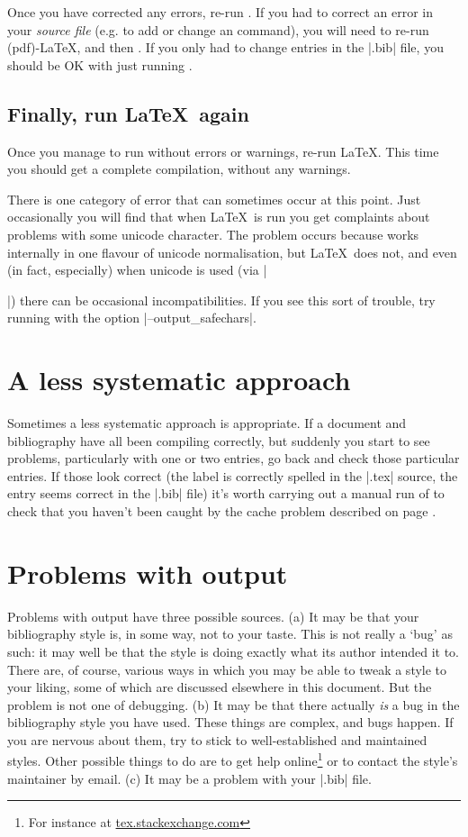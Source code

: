 Once you have corrected any errors, re-run . If you had
to correct an error in your \emph{source file} (e.g. to add or change
an  command), you will need to re-run (pdf)-\LaTeX,
and then . If you only had to change entries in the
|.bib| file, you should be OK with just running .

\subsection{Finally, run \LaTeX\ again}

Once you manage to run  without errors or warnings,
re-run \LaTeX. This time you should get a complete compilation,
without any warnings.

There is one category of error that can sometimes occur at this
point. Just occasionally you will find that when \LaTeX\ is run you
get complaints about problems with some unicode character. The problem
occurs because  works internally in one flavour of
unicode normalisation, but \LaTeX\ does not, and even (in fact,
especially) when unicode is used (via |\usepackage[utf8]{inputenc}|)
there can be occasional incompatibilities. If you see this sort of
trouble, try running  with the option
|--output_safechars|.

\section{A less systematic approach}

Sometimes a less systematic approach is appropriate. If a document and
bibliography have all been compiling correctly, but suddenly you start
to see problems, particularly with one or two entries, go back and
check those particular entries. If those look correct (the label is
correctly spelled in the |.tex| source, the entry seems correct in the
|.bib| file) it's worth carrying out a manual run of 
to check that you haven't been caught by the cache problem described
on page \pageref{cache}.

\section{Problems with output}

Problems with output have three possible sources. (a) It may be that
your bibliography style is, in some way, not to your taste. This is
not really a `bug' as such: it may well be that the style is doing
exactly what its author intended it to. There are, of course, various
ways in which you may be able to tweak a style to your liking, some of
which are discussed elsewhere in this document. But the problem is not
one of debugging. (b) It may be that there actually \emph{is} a bug in
the bibliography style you have used. These things are complex, and
bugs happen. If you are nervous about them, try to stick to
well-established and maintained styles. Other possible things to do
are to get help online\footnote{For instance at
  \url{tex.stackexchange.com}} or to contact the style's maintainer by
email. (c) It may be a problem with your |.bib| file.

